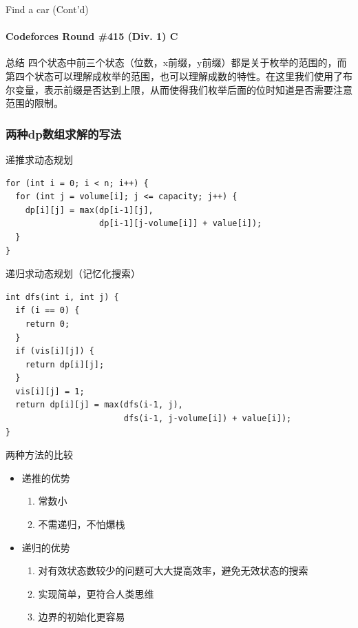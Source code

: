 \documentclass[hyperref={unicode=true}]{beamer}
\theoremstyle{definition}
\theoremstyle{proof}
\begin{document}
\begin{frame}{Find a car (Cont'd)}\framesubtitle{Codeforces Round \#415 (Div. 1) C}
  \begin{exampleblock}{总结}
    四个状态中前三个状态（位数，x前缀，y前缀）都是关于枚举的范围的，而第四个状态可以理解成枚举的范围，也可以理解成数的特性。在这里我们使用了布尔变量，表示前缀是否达到上限，从而使得我们枚举后面的位时知道是否需要注意范围的限制。
  \end{exampleblock}
\end{frame}

\subsubsection{两种dp数组求解的写法}
\begin{frame}[fragile]{递推求动态规划}
  \begin{verbatim}
for (int i = 0; i < n; i++) {
  for (int j = volume[i]; j <= capacity; j++) {
    dp[i][j] = max(dp[i-1][j],
                   dp[i-1][j-volume[i]] + value[i]);
  }
}
  \end{verbatim}
\end{frame}

\begin{frame}[fragile]{递归求动态规划（记忆化搜索）}
  \begin{verbatim}
int dfs(int i, int j) {
  if (i == 0) {
    return 0;
  }
  if (vis[i][j]) {
    return dp[i][j];
  }
  vis[i][j] = 1;
  return dp[i][j] = max(dfs(i-1, j),
                        dfs(i-1, j-volume[i]) + value[i]);
}
  \end{verbatim}
\end{frame}
\begin{frame}{两种方法的比较}
  \begin{itemize}[<+->]
  \item 递推的优势
    \begin{enumerate}
    \item 常数小
    \item 不需递归，不怕爆栈
    \end{enumerate}
  \item 递归的优势
    \begin{enumerate}
    \item 对有效状态数较少的问题可大大提高效率，避免无效状态的搜索
    \item 实现简单，更符合人类思维
    \item 边界的初始化更容易
    \end{enumerate}
  \end{itemize}
\end{frame}
\end{document}
